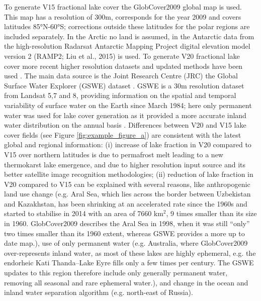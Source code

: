 \documentclass[hess, twostagejnl]{copernicus}
\begin{document}
\noindent To generate V15 fractional lake cover the GlobCover2009 global map  \citep{GLOBCOVER,arino2012glcm} is used. This map has a resolution of 300m, corresponds for the year 2009 and covers latitudes 85°N-60°S; corrections outside these latitudes for the polar regions are included separately. In the Arctic no land is assumed, in the Antarctic data from the high-resolution Radarsat Antarctic Mapping Project digital elevation model version 2 (RAMP2; Liu et al., 2015) is used. To generate V20 fractional lake cover more recent higher resolution datasets and updated methods have been used \citep{Choulga2019}. The main data source is the Joint Research Centre (JRC) the Global Surface Water Explorer (GSWE) dataset \citep{GSWE}. GSWE is a 30m resolution dataset from Landsat 5,7 and 8, providing information on the spatial and temporal variability of surface water on the Earth since March 1984; here only permanent water was used for lake cover generation as it provided a more accurate inland water distribution on the annual basis \citep{Choulga2019}. Differences between V20 and V15 lake cover fields (see Figure \ref{fig:example_figure_a}) are consistent with the latest global and regional information: (i) increase of lake fraction in V20 compared to V15 over northern latitudes is due to permafrost melt leading to a new thermokarst lake emergence, and due to higher resolution input source and its better satellite image recognition methodologies; (ii) reduction of lake fraction in V20 compared to V15 can be explained with several reasons, like anthropogenic land use change (e.g. Aral Sea, which lies across the border between Uzbekistan and Kazakhstan, has been shrinking at an accelerated rate since the 1960s and started to stabilise in 2014 with an area of 7660 km$^2$, 9 times smaller than its size in 1960. GlobCover2009 describes the Aral Sea in 1998, when it was still “only” two times smaller than its 1960 extent, whereas GSWE provides a more up to date map.), use of only permanent water (e.g. Australia, where GlobCover2009 over-represents inland water, as most of these lakes are highly ephemeral, e.g. the endorheic Kati Thanda–Lake Eyre fills only a few times per century. The GSWE updates to this region therefore include only generally permanent water, removing all seasonal and rare ephemeral water.), and change in the ocean and inland water separation algorithm (e.g. north-east of Russia). \newline 
\end{document}
